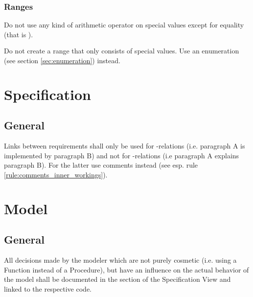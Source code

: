 \documentclass[draft]{efsguide}
\begin{document}
\subsection{Ranges}
\begin{rules}
\item Do not use any kind of arithmetic operator on special values except for equality (that is \code{==}). 
\item Do not create a range that only consists of special values. Use an enumeration (see section \ref{sec:enumeration}) instead. 
\end{rules}

\chapter{Specification}
\section{General}

\begin{rules}
\item Links between requirements shall only be used for -relations (i.e. paragraph A is implemented by paragraph B) and not for -relations (i.e paragraph A explains paragraph B). For the latter use comments instead (see esp. rule \ref{rule:comments_inner_workings}). 

\end{rules}



\chapter{Model}


\section{General}

\begin{rules}
\item \label{rule:model_general_design_choices} All decisions made by the modeler which are not purely cosmetic (i.e. using a Function instead of a Procedure), but have an influence on the actual behavior of the model shall be documented in the section  of the Specification View and linked to the respective code. 

\end{rules}
\end{document}
